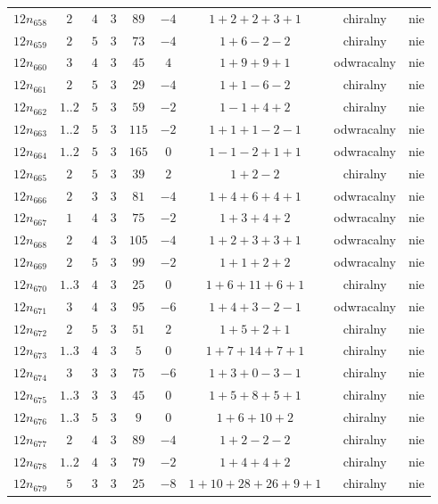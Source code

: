 \begin{longtable}{ccccccccc}
$12n_{658}$ & $2$ & $4$ & $3$ & $89$ & $-4$ & $1+2+2+3+1$ & chiralny & nie \\
$12n_{659}$ & $2$ & $5$ & $3$ & $73$ & $-4$ & $1+6-2-2$ & chiralny & nie \\
$12n_{660}$ & $3$ & $4$ & $3$ & $45$ & $4$ & $1+9+9+1$ & odwracalny & nie \\
$12n_{661}$ & $2$ & $5$ & $3$ & $29$ & $-4$ & $1+1-6-2$ & chiralny & nie \\
$12n_{662}$ & $1..2$ & $5$ & $3$ & $59$ & $-2$ & $1-1+4+2$ & chiralny & nie \\
$12n_{663}$ & $1..2$ & $5$ & $3$ & $115$ & $-2$ & $1+1+1-2-1$ & odwracalny & nie \\
$12n_{664}$ & $1..2$ & $5$ & $3$ & $165$ & $0$ & $1-1-2+1+1$ & odwracalny & nie \\
$12n_{665}$ & $2$ & $5$ & $3$ & $39$ & $2$ & $1+2-2$ & chiralny & nie \\
$12n_{666}$ & $2$ & $3$ & $3$ & $81$ & $-4$ & $1+4+6+4+1$ & odwracalny & nie \\
$12n_{667}$ & $1$ & $4$ & $3$ & $75$ & $-2$ & $1+3+4+2$ & odwracalny & nie \\
$12n_{668}$ & $2$ & $4$ & $3$ & $105$ & $-4$ & $1+2+3+3+1$ & odwracalny & nie \\
$12n_{669}$ & $2$ & $5$ & $3$ & $99$ & $-2$ & $1+1+2+2$ & odwracalny & nie \\
$12n_{670}$ & $1..3$ & $4$ & $3$ & $25$ & $0$ & $1+6+11+6+1$ & chiralny & nie \\
$12n_{671}$ & $3$ & $4$ & $3$ & $95$ & $-6$ & $1+4+3-2-1$ & odwracalny & nie \\
$12n_{672}$ & $2$ & $5$ & $3$ & $51$ & $2$ & $1+5+2+1$ & chiralny & nie \\
$12n_{673}$ & $1..3$ & $4$ & $3$ & $5$ & $0$ & $1+7+14+7+1$ & chiralny & nie \\
$12n_{674}$ & $3$ & $3$ & $3$ & $75$ & $-6$ & $1+3+0-3-1$ & chiralny & nie \\
$12n_{675}$ & $1..3$ & $3$ & $3$ & $45$ & $0$ & $1+5+8+5+1$ & chiralny & nie \\
$12n_{676}$ & $1..3$ & $5$ & $3$ & $9$ & $0$ & $1+6+10+2$ & chiralny & nie \\
$12n_{677}$ & $2$ & $4$ & $3$ & $89$ & $-4$ & $1+2-2-2$ & chiralny & nie \\
$12n_{678}$ & $1..2$ & $4$ & $3$ & $79$ & $-2$ & $1+4+4+2$ & chiralny & nie \\
$12n_{679}$ & $5$ & $3$ & $3$ & $25$ & $-8$ & $1+10+28+26+9+1$ & chiralny & nie \\

\end{longtable}
